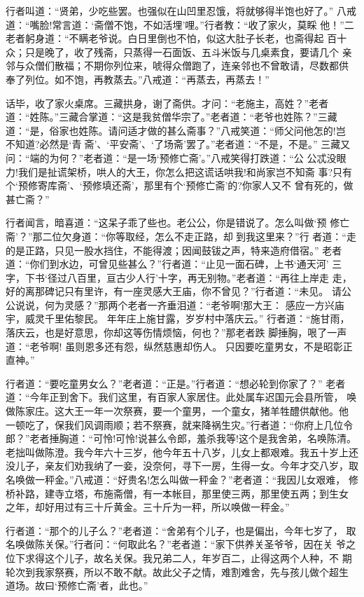 行者叫道：“贤弟，少吃些罢。也强似在山凹里忍饿，将就够得半饱也好了。”
八戒道：“嘴脸!常言道：‘斋僧不饱，不如活埋’哩。”行者教：“收了家火，莫睬
他！”二老者躬身道：“不瞒老爷说。白日里倒也不怕，似这大肚子长老，也斋得起
百十众；只是晚了，收了残斋，只蒸得一石面饭、五斗米饭与几桌素食，要请几个
亲邻与众僧们散福；不期你列位来，唬得众僧跑了，连亲邻也不曾敢请，尽数都供
奉了列位。如不饱，再教蒸去。”八戒道：“再蒸去，再蒸去！”

话毕，收了家火桌席。三藏拱身，谢了斋供。才问：“老施主，高姓？”老者
道：“姓陈。”三藏合掌道：“这是我贫僧华宗了。”老者道：“老爷也姓陈？”三藏
道：“是，俗家也姓陈。请问适才做的甚么斋事？”八戒笑道：“师父问他怎的!岂
不知道?必然是‘青斋’、‘平安斋’、‘了场斋’罢了。”老者道：“不是，不是。”
三藏又问：“端的为何？”老者道：“是一场‘预修亡斋’。”八戒笑得打跌道：“公
公忒没眼力!我们是扯谎架桥，哄人的大王，你怎么把这谎话哄我!和尚家岂不知斋
事?只有个‘预修寄库斋’、‘预修填还斋’，那里有个‘预修亡斋’的?你家人又不
曾有死的，做甚亡斋？”

行者闻言，暗喜道：“这呆子乖了些也。老公公，你是错说了。怎么叫做‘预
修亡斋’？”那二位欠身道：“你等取经，怎么不走正路，却到我这里来？”行
者道：“走的是正路，只见一股水挡住，不能得渡；因闻鼓钹之声，特来造府借宿。”
老者道：“你们到水边，可曾见些甚么？”行者道：“止见一面石碑，上书‘通天河’
三字，下书‘径过八百里，亘古少人行’十字，再无别物。”老者道：“再往上岸走
走，好的离那碑记只有里许，有一座灵感大王庙，你不曾见？”行者道：“未见。
请公公说说，何为灵感？”那两个老者一齐垂泪道：“老爷啊!那大王：
感应一方兴庙宇，威灵千里佑黎民。
年年庄上施甘露，岁岁村中落庆云。”
行者道：“施甘雨，落庆云，也是好意思，你却这等伤情烦恼，何也？”那老者跌
脚捶胸，哏了一声道：“老爷啊!
虽则恩多还有怨，纵然慈惠却伤人。
只因要吃童男女，不是昭彰正直神。”

行者道：“要吃童男女么？”老者道：“正是。”行者道：“想必轮到你家了？”
老者道：“今年正到舍下。我们这里，有百家人家居住。此处属车迟国元会县所管，
唤做陈家庄。这大王一年一次祭赛，要一个童男，一个童女，猪羊牲醴供献他。他
一顿吃了，保我们风调雨顺；若不祭赛，就来降祸生灾。”行者道：“你府上几位令
郎？”老者捶胸道：“可怜!可怜!说甚么令郎，羞杀我等!这个是我舍弟，名唤陈清。
老拙叫做陈澄。我今年六十三岁，他今年五十八岁，儿女上都艰难。我五十岁上还
没儿子，亲友们劝我纳了一妾，没奈何，寻下一房，生得一女。今年才交八岁，取
名唤做一秤金。”八戒道：“好贵名!怎么叫做一秤金？”老者道：“我因儿女艰难，
修桥补路，建寺立塔，布施斋僧，有一本帐目，那里使三两，那里使五两；到生女
之年，却好用过有三十斤黄金。三十斤为一秤，所以唤做一秤金。”

行者道：“那个的儿子么？”老者道：“舍弟有个儿子，也是偏出，今年七岁了，
取名唤做陈关保。”行者问：“何取此名？”老者道：“家下供养关圣爷爷，因在关
爷之位下求得这个儿子，故名关保。我兄弟二人，年岁百二，止得这两个人种，不
期轮次到我家祭赛，所以不敢不献。故此父子之情，难割难舍，先与孩儿做个超生
道场。故曰‘预修亡斋’者，此也。”

